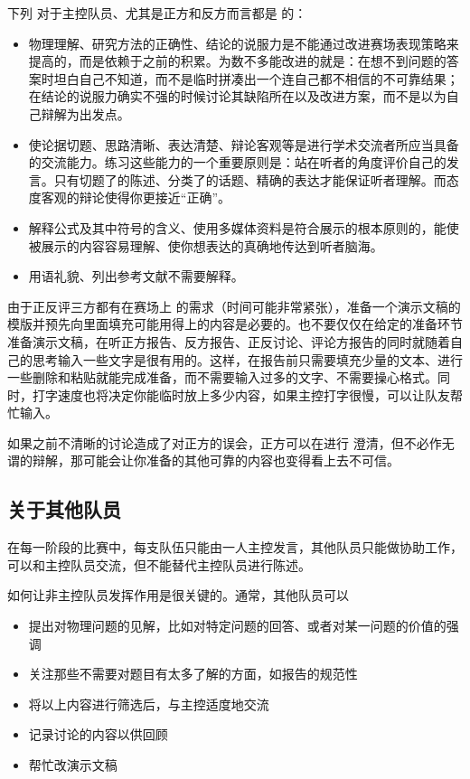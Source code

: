 \documentclass[a4paper,10pt,english]{sphinxmanual}
\begin{document}
下列  对于主控队员、尤其是正方和反方而言都是  的：
\begin{itemize}
\item {} 
物理理解、研究方法的正确性、结论的说服力是不能通过改进赛场表现策略来提高的，而是依赖于之前的积累。为数不多能改进的就是：在想不到问题的答案时坦白自己不知道，而不是临时拼凑出一个连自己都不相信的不可靠结果；在结论的说服力确实不强的时候讨论其缺陷所在以及改进方案，而不是以为自己辩解为出发点。

\item {} 
使论据切题、思路清晰、表达清楚、辩论客观等是进行学术交流者所应当具备的交流能力。练习这些能力的一个重要原则是：站在听者的角度评价自己的发言。只有切题了的陈述、分类了的话题、精确的表达才能保证听者理解。而态度客观的辩论使得你更接近“正确”。

\item {} 
解释公式及其中符号的含义、使用多媒体资料是符合展示的根本原则的，能使被展示的内容容易理解、使你想表达的真确地传达到听者脑海。

\item {} 
用语礼貌、列出参考文献不需要解释。

\end{itemize}

由于正反评三方都有在赛场上  的需求（时间可能非常紧张），准备一个演示文稿的模版并预先向里面填充可能用得上的内容是必要的。也不要仅仅在给定的准备环节准备演示文稿，在听正方报告、反方报告、正反讨论、评论方报告的同时就随着自己的思考输入一些文字是很有用的。这样，在报告前只需要填充少量的文本、进行一些删除和粘贴就能完成准备，而不需要输入过多的文字、不需要操心格式。同时，打字速度也将决定你能临时放上多少内容，如果主控打字很慢，可以让队友帮忙输入。

如果之前不清晰的讨论造成了对正方的误会，正方可以在进行  澄清，但不必作无谓的辩解，那可能会让你准备的其他可靠的内容也变得看上去不可信。


\subsection{关于其他队员}
\label{\detokenize{7. Tournament:id7}}
在每一阶段的比赛中，每支队伍只能由一人主控发言，其他队员只能做协助工作，可以和主控队员交流，但不能替代主控队员进行陈述。

如何让非主控队员发挥作用是很关键的。通常，其他队员可以
\begin{itemize}
\item {} 
提出对物理问题的见解，比如对特定问题的回答、或者对某一问题的价值的强调

\item {} 
关注那些不需要对题目有太多了解的方面，如报告的规范性

\item {} 
将以上内容进行筛选后，与主控适度地交流

\item {} 
记录讨论的内容以供回顾

\item {} 
帮忙改演示文稿

\end{itemize}
\end{document}
